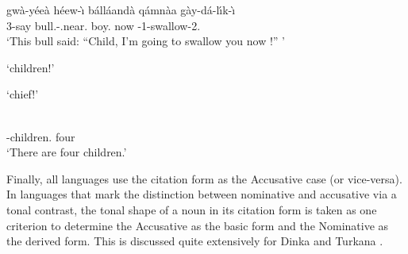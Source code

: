 \begin{exe}
\ex\label{DatVoc}
\raggedright
\gll gw\`a-y\'ee\textesh\`a h\'eew-\`\i{} b\'all\'aand\`a q\'amn\`aa g\`ay-d\'a-l\'\i k-\textltailn\`\i\\
3\sg{}-say bull.\nom{}-\dem{}.near.\sg{} boy.\acc{} now \fut{}-1\sg{}-swallow-2\sg{}.\obj{}\\
\glt `This bull said: ``Child, I'm going to swallow you now !'' '
\end{exe}


\begin{exe}\ex\label{TurVoc}
\begin{xlist}
\ex{}\glt `children!'

\ex{}\glt	`chief!'
\end{xlist}
\end{exe}

\begin{exe}
\ex\label{TurNonVoc}
\gll{} \\
\NC{}-children.\acc{} four\\
\glt `There are four children.' %
\end{exe}

Finally, all languages use the citation form as the Accusative case (or vice-versa).
In languages that mark the distinction between nominative and accusative via a tonal contrast, the tonal shape of a noun in its citation form is taken as one criterion to determine the Accusative as the basic form and the Nominative as the derived form.
This is discussed quite extensively for Dinka \citep[273]{Andersen:1991} and Turkana \citep[66]{Dimmendaal:1982}.



